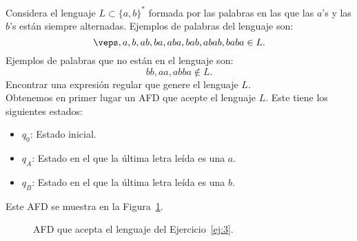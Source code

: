 \documentclass[12pt]{article}
\begin{document}
    \begin{ejercicio} \label{ej:3}
        Considera el lenguaje $L\subset \{a,b\}^*$ formada por las palabras en las que las $a$'s y las $b$'s están siempre alternadas. Ejemplos de palabras del lenguaje son:
        \begin{equation*}
            \veps,a,b,ab,ba,aba,bab,abab,baba \in L.
        \end{equation*}
        Ejemplos de palabras que no están en el lenguaje son:
        \begin{equation*}
            bb,aa,abba \notin L.
        \end{equation*}
        Encontrar una expresión regular que genere el lenguaje $L$.\\

        Obtenemos en primer lugar un AFD que acepte el lenguaje $L$. Este tiene los siguientes estados:
        \begin{itemize}
            \item $q_0$: Estado inicial.
            \item $q_A$: Estado en el que la última letra leída es una $a$.
            \item $q_B$: Estado en el que la última letra leída es una $b$.
        \end{itemize}

        Este AFD se muestra en la Figura~\ref{fig:ej3_AFD}.
        \begin{figure}[h]
            \centering
            \caption{AFD que acepta el lenguaje del Ejercicio~\ref{ej:3}.}
            \label{fig:ej3_AFD}
        \end{figure}


\end{ejercicio}
\end{document}
